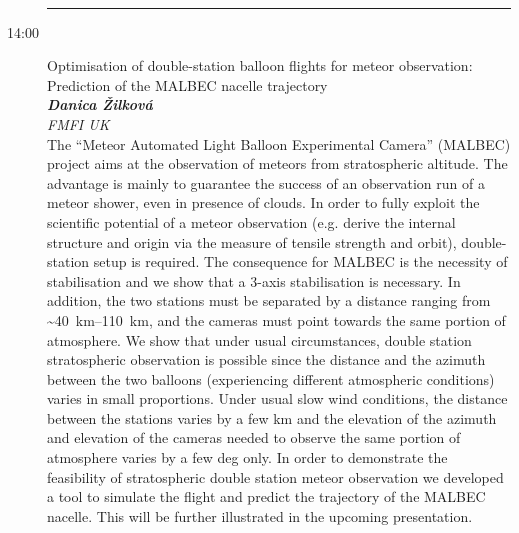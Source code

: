 \documentclass[a4paper]{report}
\begin{document}
\begin{description}
 \\                    \rule{\paperwidth}{0.4pt}
                            \item[14:00]
                    {\Large Optimisation of double-station balloon flights for meteor observation: Prediction of the MALBEC nacelle trajectory} \\[1ex]
                                            \textit{\textbf{Danica Žilková}} \\%
                                        \textit{FMFI UK} \\[1ex]                    The “Meteor Automated Light Balloon Experimental Camera” (MALBEC) project aims at the observation of meteors from stratospheric altitude. The advantage is mainly to guarantee the success of an observation run of a meteor shower, even in presence of clouds. In order to fully exploit the scientific potential of a meteor observation (e.g. derive the internal structure and origin via the measure of tensile strength and orbit), double-station setup is required. The consequence for MALBEC is the necessity of stabilisation and we show that a 3-axis stabilisation is necessary. In addition, the two stations must be separated by a distance ranging from \textasciitilde\SIrange{40}{110}{\kilo\metre}, and the cameras must point towards the same portion of atmosphere. We show that under usual circumstances, double station stratospheric observation is possible since the distance and the azimuth between the two balloons (experiencing different atmospheric conditions) varies in small proportions. Under usual slow wind conditions, the distance between the stations varies by a few km and the elevation of the azimuth and elevation of the cameras needed to observe the same portion of atmosphere varies by a few deg only. In order to demonstrate the feasibility of stratospheric double station meteor observation we developed a tool to simulate the flight and predict the trajectory of the MALBEC nacelle. This will be further illustrated in the upcoming presentation.
 \\                    
                    \end{description}
\end{document}
